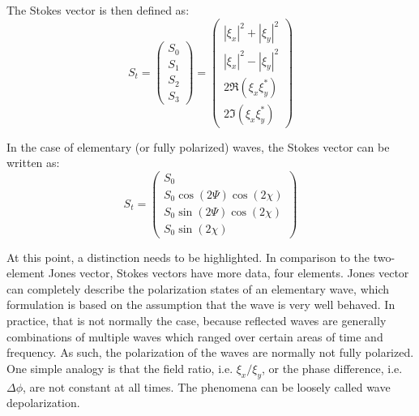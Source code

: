 The Stokes vector is then defined as:
\begin{equation}
S_t = 
\left(
\begin{array}{c}
 S_0 \\
 S_1 \\
 S_2 \\
 S_3
\end{array}
\right)
=
\left(
\begin{array}{c}
 |\xi_x|^2 + |\xi_y|^2 \\
 |\xi_x|^2 - |\xi_y|^2 \\
 2\Re(\xi_x \xi_y^*) \\
 2\Im(\xi_x \xi_y^*)
\end{array}
\right)
\end{equation}

In the case of elementary (or fully polarized) waves, the Stokes vector can be written as:
\begin{equation}
S_t = 
\left(
\begin{array}{c}
 S_0 \\
 S_0 \cos(2\Psi) \cos(2\chi) \\
 S_0 \sin(2\Psi) \cos(2\chi) \\
 S_0 \sin(2\chi)
\end{array}
\right)
\end{equation}


At this point, a distinction needs to be highlighted. %
In comparison to the two-element Jones vector, Stokes vectors have more data, four elements. 
Jones vector can completely describe the polarization states of an elementary wave, which formulation is based on the assumption that the wave is very well behaved.
In practice, that is not normally the case, because reflected waves are generally combinations of multiple waves which ranged over certain areas of time and frequency. 
As such, the polarization of the waves are normally not fully polarized.
One simple analogy is that the field ratio, i.e. $\xi_x/\xi_y$, or the phase difference, i.e. $\Delta \phi$, are not constant at all times.
The phenomena can be loosely called wave depolarization.

